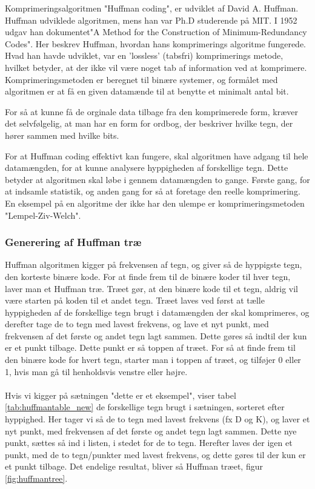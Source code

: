 Komprimeringsalgoritmen "Huffman coding", er udviklet af David A. Huffman. Huffman udviklede algoritmen, mens han var Ph.D studerende på MIT. I 1952 udgav han dokumentet"A Method for the Construction of Minimum-Redundancy Codes"\cite{A_Method_for}. Her beskrev Huffman, hvordan hans komprimerings algoritme fungerede. Hvad han havde udviklet, var en 'lossless' (tabsfri) komprimerings metode, hvilket betyder, at der ikke vil være noget tab af information ved at komprimere. Komprimeringsmetoden er beregnet til binære systemer, og formålet med algoritmen er at få en given datamænde til at benytte et minimalt antal bit. 

For så at kunne få de orginale data tilbage fra den komprimerede form, kræver det selvfølgelig, at man har en form for ordbog, der beskriver hvilke tegn, der hører sammen med hvilke bits.

For at Huffman coding effektivt kan fungere, skal algoritmen have adgang til hele datamængden, for at kunne analysere hyppigheden af forskellige tegn. Dette betyder at algoritmen skal løbe i gennem datamængden to gange. Første gang, for at indsamle statistik, og anden gang for så at foretage den reelle komprimering. En eksempel på en algoritme der ikke har den ulempe er komprimeringsmetoden "Lempel-Ziv-Welch".


\subsubsection{Generering af Huffman træ}
Huffman algoritmen kigger på frekvensen af tegn, og giver så de hyppigste tegn, den korteste binære kode. For at finde frem til de binære koder til hver tegn, laver man et Huffman træ. Træet gør, at den binære kode til et tegn, aldrig vil være starten på koden til et andet tegn. Træet laves ved først at tælle hyppigheden af de forskellige tegn brugt i datamængden der skal komprimeres, og derefter tage de to tegn med lavest frekvens, og lave et nyt punkt, med frekvensen af det første og andet tegn lagt sammen. Dette gøres så indtil der kun er et punkt tilbage. Dette punkt er så toppen af træet. For så at finde frem til den binære kode for hvert tegn, starter man i toppen af træet, og tilføjer 0 eller 1, hvis man gå til henholdsvis venstre eller højre.
\\
\\
Hvis vi kigger på sætningen "dette er et eksempel", viser tabel \ref{tab:huffmantable_new} de forskellige tegn brugt i sætningen, sorteret efter hyppighed. Her tager vi så de to tegn med lavest frekvens (fx D og K), og laver et nyt punkt, med frekvensen af det første og andet tegn lagt sammen. Dette nye punkt, sættes så ind i listen, i stedet for de to tegn. Herefter laves der igen et punkt, med de to tegn/punkter med lavest frekvens, og dette gøres til der kun er et punkt tilbage. Det endelige resultat, bliver så Huffman træet, figur \ref{fig:huffmantree}. 



